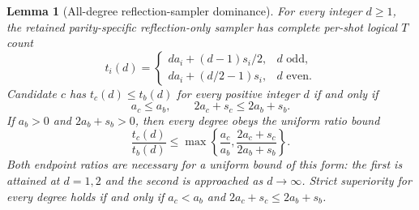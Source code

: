 \documentclass[11pt]{article}
\newtheorem{lemma}[theorem]{Lemma}
\begin{document}
\begin{lemma}[All-degree reflection-sampler dominance]
\label{thm:representation-sampler-dominance}
For every integer $d\geq1$, the retained parity-specific reflection-only
sampler has complete per-shot logical $T$ count
\begin{equation}
 t_i(d)=
 \begin{cases}
   da_i+(d-1)s_i/2,&d\text{ odd},\\
   da_i+(d/2-1)s_i,&d\text{ even}.
 \end{cases}
 \label{eq:representation-parity-cost}
\end{equation}
Candidate $c$ has $t_c(d)\leq t_b(d)$ for every positive integer $d$
if and only if
\begin{equation}
 a_c\leq a_b,\qquad 2a_c+s_c\leq2a_b+s_b.
 \label{eq:representation-all-degree-condition}
\end{equation}
If $a_b>0$ and $2a_b+s_b>0$, then every degree obeys the uniform ratio
bound
\begin{equation}
 \frac{t_c(d)}{t_b(d)}\leq
 \max\left\{\frac{a_c}{a_b},
             \frac{2a_c+s_c}{2a_b+s_b}\right\}.
 \label{eq:representation-all-degree-ratio}
\end{equation}
Both endpoint ratios are necessary for a uniform bound of this form:
the first is attained at $d=1,2$ and the second is approached as
$d\longrightarrow\infty$. Strict superiority for every degree holds
if and only if $a_c<a_b$ and $2a_c+s_c\leq2a_b+s_b$.
\end{lemma}
\end{document}
